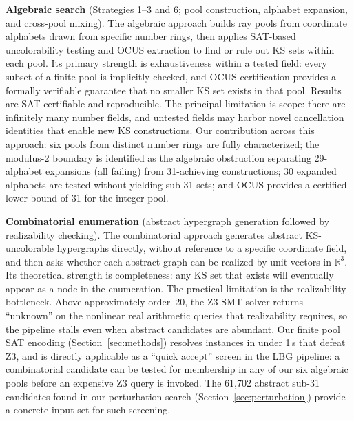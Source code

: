 \documentclass[twocolumn,pra,superscriptaddress,nofootinbib]{revtex4-2}
\newcommand{\R}{\mathbb{R}}
\begin{document}
\textbf{Algebraic search} (Strategies 1--3 and 6; pool construction, alphabet
expansion, and cross-pool mixing). The algebraic approach builds ray pools from
coordinate alphabets drawn from specific number rings, then applies SAT-based
uncolorability testing and OCUS extraction to find or rule out KS sets within
each pool. Its primary strength is exhaustiveness within a tested field: every
subset of a finite pool is implicitly checked, and OCUS certification provides
a formally verifiable guarantee that no smaller KS set exists in that pool.
Results are SAT-certifiable and reproducible. The principal limitation is scope:
there are infinitely many number fields, and untested fields may harbor novel
cancellation identities that enable new KS constructions.
Our contribution across this approach: six pools from distinct number rings are
fully characterized; the modulus-2 boundary is identified as the algebraic
obstruction separating 29-alphabet expansions (all failing) from 31-achieving
constructions; 30 expanded alphabets are tested without yielding sub-31 sets;
and OCUS provides a certified lower bound of 31 for the integer pool.

\textbf{Combinatorial enumeration}
\cite{LiBrightGanesh2024,KirchwegarPeitlSzeider2023}
(abstract hypergraph generation followed by realizability checking).
The combinatorial approach generates abstract KS-uncolorable hypergraphs
directly, without reference to a specific coordinate field, and then asks
whether each abstract graph can be realized by unit vectors in $\R^3$.
Its theoretical strength is completeness: any KS set that exists will eventually
appear as a node in the enumeration. The practical limitation is the realizability
bottleneck. Above approximately order~20, the Z3 SMT solver returns ``unknown''
on the nonlinear real arithmetic queries that realizability requires, so the
pipeline stalls even when abstract candidates are abundant.
Our finite pool SAT encoding (Section~\ref{sec:methods}) resolves instances
in under 1\,s that defeat Z3, and is directly applicable as a ``quick accept''
screen in the LBG pipeline: a combinatorial candidate can be tested for
membership in any of our six algebraic pools before an expensive Z3 query is
invoked. The 61,702 abstract sub-31 candidates found in our perturbation search
(Section~\ref{sec:perturbation}) provide a concrete input set for such screening.
\end{document}
